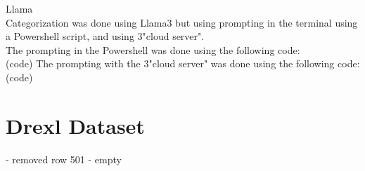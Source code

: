 \begin{flushleft}
Llama\\
Categorization was done using Llama3 but using prompting in the terminal using a Powershell script, and using 3"cloud server".\\
The prompting in the Powershell was done using the following code:\\
(code)
The prompting with the 3"cloud server" was done using the following code:\\
(code)

\section{Drexl Dataset}
- removed row 501 - empty

\end{flushleft}
